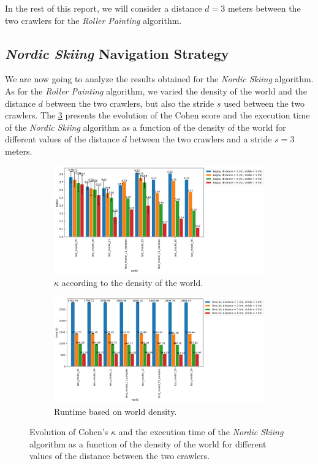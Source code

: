 In the rest of this report, we will consider a distance $d = 3$ meters between the two crawlers for the \textit{Roller Painting} algorithm.

\subsection*{\textit{Nordic Skiing} Navigation Strategy}

We are now going to analyze the results obtained for the \textit{Nordic Skiing} algorithm.
As for the \textit{Roller Painting} algorithm, we varied the density of the world and the distance $d$ between the two crawlers, but also the stride $s$ used between the two crawlers.
The \ref{fig:ski_nordique-world_d} presents the evolution of the Cohen score and the execution time of the \textit{Nordic Skiing} algorithm as a function of the density of the world for different values of the distance $d$ between the two crawlers and a stride $s = 3$ meters.

\begin{figure}[h!]
	\centering
	\begin{subfigure}[t]{0.99\linewidth}
		\includegraphics[width=\linewidth]{graphics/ski_nordique-kappa_vs_world_for_each_d.png}
		\caption{$\kappa$ according to the density of the world.}
		\label{fig:ski_nordique-kappa_vs_world_d}
	\end{subfigure}
	\hfill
	\begin{subfigure}[t]{0.99\linewidth}
		\includegraphics[width=\linewidth]{graphics/ski_nordique-time_vs_world_for_each_d.png}
		\caption{Runtime based on world density.}
		\label{fig:ski_nordique-time_vs_world_d}
	\end{subfigure}
	\caption{Evolution of Cohen's $\kappa$ and the execution time of the \textit{Nordic Skiing} algorithm as a function of the density of the world for different values of the distance between the two crawlers.}
	\label{fig:ski_nordique-world_d}
\end{figure}

